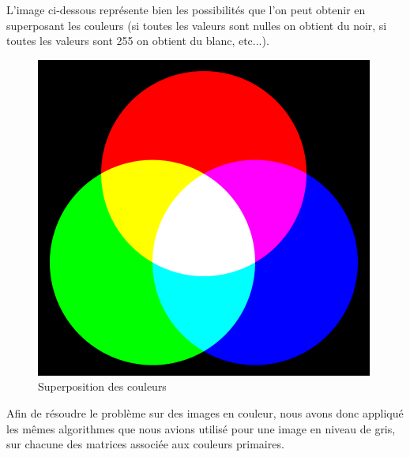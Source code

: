   L'image ci-dessous représente bien les possibilités que l'on peut obtenir en superposant les couleurs (si toutes les valeurs sont nulles on obtient du noir, si toutes les valeurs sont 255 on obtient du blanc, etc...).
 
 \begin{figure}[H]
 \centering
 \includegraphics[scale=0.3]{Images/RGB.png}
 \caption{Superposition des couleurs}
  \end{figure}
  
Afin de résoudre le problème sur des images en couleur, nous avons donc appliqué les mêmes algorithmes que nous avions utilisé pour une image en niveau de gris, sur chacune des matrices associée aux couleurs primaires.\newline
 
